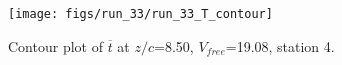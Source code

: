 \begin{figure}[H]
\centering
\texttt{[image: figs/run\_33/run\_33\_T\_contour]}
\caption{Contour plot of $\overline{t}$ at $z/c$=8.50, $V_{free}$=19.08, station 4.}
\label{fig:run_33_T_contour}
\end{figure}



